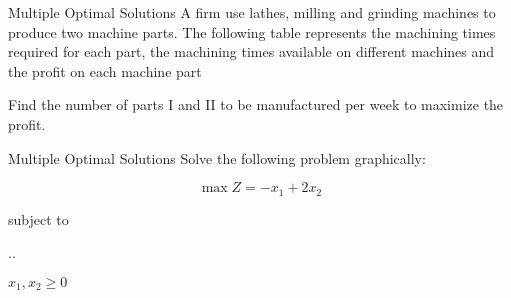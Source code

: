   \begin{frameExample}{Multiple Optimal Solutions}{}
    A firm use lathes, milling and grinding machines to produce two machine parts. The following table represents the machining times required for each part, the machining times available on different machines and the profit on each machine part

    {
      \centering
      \par
    }

    Find the number of parts I and II to be manufactured per week to maximize the profit.
  \end{frameExample}


  \begin{frameExample}{Multiple Optimal Solutions}{}
    Solve the following problem graphically:

    \[ \max Z = -x_1 + 2x_2 \]

  {\centering
    subject to

    \sysdelim..

    \vspace{5mm}

    $x_1, x_2 \geq 0$
    \par}
  \end{frameExample}
  
